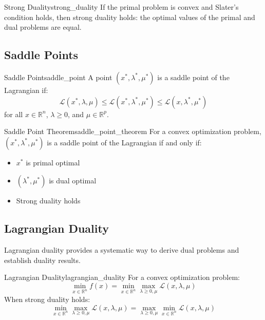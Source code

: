 \begin{theorem}{Strong Duality}{strong_duality}
    If the primal problem is convex and Slater's condition holds, then strong duality holds: the optimal values of the primal and dual problems are equal.
\end{theorem}

\subsection{Saddle Points}

\begin{definition}{Saddle Point}{saddle_point}
    A point $(x^*, \lambda^*, \mu^*)$ is a saddle point of the Lagrangian if:
    \[
    \mathcal{L}(x^*, \lambda, \mu) \leq \mathcal{L}(x^*, \lambda^*, \mu^*) \leq \mathcal{L}(x, \lambda^*, \mu^*)
    \]
    for all $x \in \mathbb{R}^n$, $\lambda \geq 0$, and $\mu \in \mathbb{R}^p$.
\end{definition}

\begin{theorem}{Saddle Point Theorem}{saddle_point_theorem}
    For a convex optimization problem, $(x^*, \lambda^*, \mu^*)$ is a saddle point of the Lagrangian if and only if:
    \begin{itemize}
        \item $x^*$ is primal optimal
        \item $(\lambda^*, \mu^*)$ is dual optimal
        \item Strong duality holds
    \end{itemize}
\end{theorem}

\subsection{Lagrangian Duality}

Lagrangian duality provides a systematic way to derive dual problems and establish duality results.

\begin{theorem}{Lagrangian Duality}{lagrangian_duality}
    For a convex optimization problem:
    \[
    \min_{x \in \mathbb{R}^n} f(x) = \min_{x \in \mathbb{R}^n} \max_{\lambda \geq 0, \mu} \mathcal{L}(x, \lambda, \mu)
    \]
    When strong duality holds:
    \[
    \min_{x \in \mathbb{R}^n} \max_{\lambda \geq 0, \mu} \mathcal{L}(x, \lambda, \mu) = \max_{\lambda \geq 0, \mu} \min_{x \in \mathbb{R}^n} \mathcal{L}(x, \lambda, \mu)
    \]
\end{theorem}

